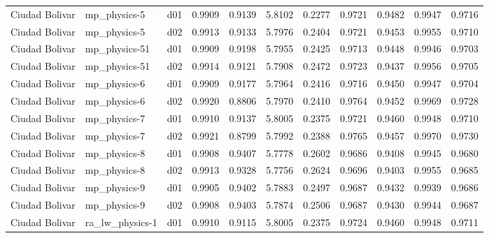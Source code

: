 \begin{longtable}{lllrrrrrrrr}
       Ciudad Bolivar  &          mp\_physics-5 &     d01 &   0.9909 &   0.9139 &   5.8102 &       0.2277 &        0.9721 &       0.9482 &           0.9947 &  0.9716 \\
       Ciudad Bolivar  &          mp\_physics-5 &     d02 &   0.9913 &   0.9133 &   5.7976 &       0.2404 &        0.9721 &       0.9453 &           0.9955 &  0.9710 \\
       Ciudad Bolivar  &         mp\_physics-51 &     d01 &   0.9909 &   0.9198 &   5.7955 &       0.2425 &        0.9713 &       0.9448 &           0.9946 &  0.9703 \\
       Ciudad Bolivar  &         mp\_physics-51 &     d02 &   0.9914 &   0.9121 &   5.7908 &       0.2472 &        0.9723 &       0.9437 &           0.9956 &  0.9705 \\
       Ciudad Bolivar  &          mp\_physics-6 &     d01 &   0.9909 &   0.9177 &   5.7964 &       0.2416 &        0.9716 &       0.9450 &           0.9947 &  0.9704 \\
       Ciudad Bolivar  &          mp\_physics-6 &     d02 &   0.9920 &   0.8806 &   5.7970 &       0.2410 &        0.9764 &       0.9452 &           0.9969 &  0.9728 \\
       Ciudad Bolivar  &          mp\_physics-7 &     d01 &   0.9910 &   0.9137 &   5.8005 &       0.2375 &        0.9721 &       0.9460 &           0.9948 &  0.9710 \\
       Ciudad Bolivar  &          mp\_physics-7 &     d02 &   0.9921 &   0.8799 &   5.7992 &       0.2388 &        0.9765 &       0.9457 &           0.9970 &  0.9730 \\
       Ciudad Bolivar  &          mp\_physics-8 &     d01 &   0.9908 &   0.9407 &   5.7778 &       0.2602 &        0.9686 &       0.9408 &           0.9945 &  0.9680 \\
       Ciudad Bolivar  &          mp\_physics-8 &     d02 &   0.9913 &   0.9328 &   5.7756 &       0.2624 &        0.9696 &       0.9403 &           0.9955 &  0.9685 \\
       Ciudad Bolivar  &          mp\_physics-9 &     d01 &   0.9905 &   0.9402 &   5.7883 &       0.2497 &        0.9687 &       0.9432 &           0.9939 &  0.9686 \\
       Ciudad Bolivar  &          mp\_physics-9 &     d02 &   0.9908 &   0.9403 &   5.7874 &       0.2506 &        0.9687 &       0.9430 &           0.9944 &  0.9687 \\
       Ciudad Bolivar  &       ra\_lw\_physics-1 &     d01 &   0.9910 &   0.9115 &   5.8005 &       0.2375 &        0.9724 &       0.9460 &           0.9948 &  0.9711 \\

\end{longtable}
